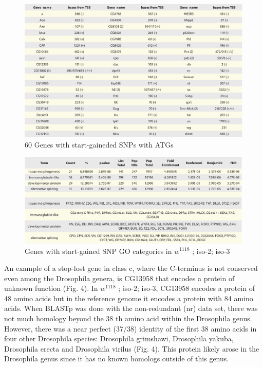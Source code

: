 \begin{figure}
    \centering
    \includegraphics[width=14cm]{snpeff_table5.png}
    \caption{60 Genes with start-gaineded SNPs with ATGs}
    \label{fig:snpeffTab3}
\end{figure}


\begin{figure}
    \centering
    \includegraphics[width=14cm]{snpeff_table6.png}
    \caption{Genes with start-gained SNP GO categories in $w^{1118}$ ; iso-2; iso-3}
    \label{fig:snpeffTab3}
\end{figure}

An example of a stop-lost gene in class c, where the C-terminus is not conserved even among the Drosophila genera, is CG13958 that encodes a protein of unknown function (Fig. 4). In $w^{1118}$ ; iso-2; iso-3, CG13958 encodes a protein of 48 amino acids but in the reference genome it encodes a protein with 84 amino acids.  When BLASTp was done with the non-redundant (nr) data set, there was not much homology beyond the 38 th amino acid within the Drosophila genus. However, there was a near perfect (37/38) identity of the first 38 amino acids in four other Drosophila species: Drosophila grimshawi, Drosophila yakuba, Drosophila erecta and Drosophila virilus (Fig. 4). This protein likely arose in the Drosophila genus since it has no known homologs outside of this genus.

